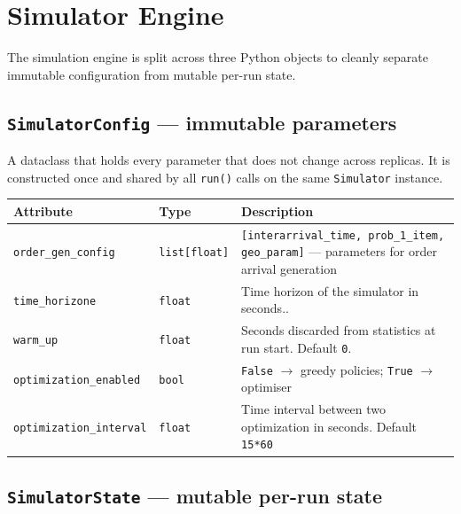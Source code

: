 \documentclass[a4paper,10pt]{article}
\begin{document}
\newpage \clearpage
\section{Simulator Engine}

The simulation engine is split across three Python objects to cleanly separate immutable configuration from mutable per-run state.

\subsection{\texttt{SimulatorConfig} — immutable parameters}

A dataclass that holds every parameter that does not change across replicas. It is constructed once and shared by all \texttt{run()} calls on the same \texttt{Simulator} instance.

\vspace{0.4em}
\begin{tabularx}{\textwidth}{l l X}
\toprule
\textbf{Attribute} & \textbf{Type} & \textbf{Description} \\
\midrule
\texttt{order\_gen\_config}    & \texttt{list[float]}  & \texttt{[interarrival\_time, prob\_1\_item, geo\_param]} — parameters for order arrival generation \\
\texttt{time\_horizone}        & \texttt{float}        & Time horizon of the simulator in seconds.. \\
\texttt{warm\_up}              & \texttt{float}        & Seconds discarded from statistics at run start. Default \texttt{0}. \\
\texttt{optimization\_enabled} & \texttt{bool}         & \texttt{False} $\to$ greedy policies; \texttt{True} $\to$ optimiser \\
\texttt{optimization\_interval} & \texttt{float}        & Time interval between two optimization in seconds. Default \texttt{15*60} \\
\bottomrule
\end{tabularx}

\subsection{\texttt{SimulatorState} — mutable per-run state}
\end{document}

